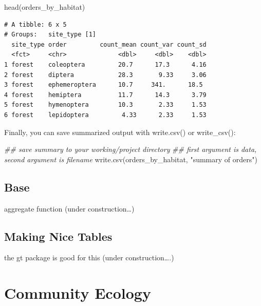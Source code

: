 \documentclass[
  letterpaper,
  DIV=11,
  numbers=noendperiod]{scrreprt}
\newenvironment{Shaded}{\begin{snugshade}}{\end{snugshade}}
\newcommand{\DocumentationTok}[1]{\textcolor[rgb]{0.37,0.37,0.37}{\textit{#1}}}
\newcommand{\FunctionTok}[1]{\textcolor[rgb]{0.28,0.35,0.67}{#1}}
\newcommand{\NormalTok}[1]{\textcolor[rgb]{0.00,0.23,0.31}{#1}}
\newcommand{\StringTok}[1]{\textcolor[rgb]{0.13,0.47,0.30}{#1}}
\begin{document}
\begin{Shaded}
\begin{Highlighting}[]
\FunctionTok{head}\NormalTok{(orders\_by\_habitat)}
\end{Highlighting}
\end{Shaded}

\begin{verbatim}
# A tibble: 6 x 5
# Groups:   site_type [1]
  site_type order         count_mean count_var count_sd
  <fct>     <chr>              <dbl>     <dbl>    <dbl>
1 forest    coleoptera         20.7      17.3      4.16
2 forest    diptera            28.3       9.33     3.06
3 forest    ephemeroptera      10.7     341.      18.5 
4 forest    hemiptera          11.7      14.3      3.79
5 forest    hymenoptera        10.3       2.33     1.53
6 forest    lepidoptera         4.33      2.33     1.53
\end{verbatim}

Finally, you can save summarized output with write.csv() or
write\_csv():

\begin{Shaded}
\begin{Highlighting}[]
\DocumentationTok{\#\# save summary to your working/project directory}
\DocumentationTok{\#\# first argument is data, second argument is filename}
\FunctionTok{write.csv}\NormalTok{(orders\_by\_habitat, }\StringTok{"summary of orders"}\NormalTok{)}
\end{Highlighting}
\end{Shaded}

\hypertarget{base-3}{%
\subsection{Base}\label{base-3}}

aggregate function (under construction\ldots)

\hypertarget{making-nice-tables}{%
\subsection{Making Nice Tables}\label{making-nice-tables}}

the gt package is good for this (under construction\ldots.)

\hypertarget{community-ecology}{%
\section{Community Ecology}\label{community-ecology}}
\end{document}
